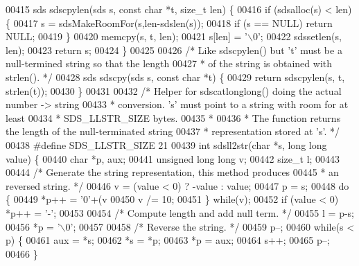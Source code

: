 \begin{DoxyCode}
{00415 sds sdscpylen(sds s, \textcolor{keyword}{const} \textcolor{keywordtype}{char} *t, size\_t len) \{
00416     \textcolor{keywordflow}{if} (sdsalloc(s) < len) \{
00417         s = sdsMakeRoomFor(s,len-sdslen(s));
00418         \textcolor{keywordflow}{if} (s == NULL) \textcolor{keywordflow}{return} NULL;
00419     \}
00420     memcpy(s, t, len);
00421     s[len] = \textcolor{stringliteral}{'\(\backslash\)0'};
00422     sdssetlen(s, len);
00423     \textcolor{keywordflow}{return} s;
00424 \}
00425 
00426 \textcolor{comment}{/* Like sdscpylen() but 't' must be a null-termined string so that the length}
00427 \textcolor{comment}{ * of the string is obtained with strlen(). */}
00428 sds sdscpy(sds s, \textcolor{keyword}{const} \textcolor{keywordtype}{char} *t) \{
00429     \textcolor{keywordflow}{return} sdscpylen(s, t, strlen(t));
00430 \}
00431 
00432 \textcolor{comment}{/* Helper for sdscatlonglong() doing the actual number -> string}
00433 \textcolor{comment}{ * conversion. 's' must point to a string with room for at least}
00434 \textcolor{comment}{ * SDS\_LLSTR\_SIZE bytes.}
00435 \textcolor{comment}{ *}
00436 \textcolor{comment}{ * The function returns the length of the null-terminated string}
00437 \textcolor{comment}{ * representation stored at 's'. */}
00438 \textcolor{preprocessor}{#}\textcolor{preprocessor}{define} \textcolor{preprocessor}{SDS\_LLSTR\_SIZE} 21
00439 \textcolor{keywordtype}{int} sdsll2str(\textcolor{keywordtype}{char} *s, \textcolor{keywordtype}{long} \textcolor{keywordtype}{long} value) \{
00440     \textcolor{keywordtype}{char} *p, aux;
00441     \textcolor{keywordtype}{unsigned} \textcolor{keywordtype}{long} \textcolor{keywordtype}{long} v;
00442     size\_t l;
00443 
00444     \textcolor{comment}{/* Generate the string representation, this method produces}
00445 \textcolor{comment}{     * an reversed string. */}
00446     v = (value < 0) ? -value : value;
00447     p = s;
00448     \textcolor{keywordflow}{do} \{
00449         *p++ = \textcolor{stringliteral}{'0'}+(v%
00450         v /= 10;
00451     \} \textcolor{keywordflow}{while}(v);
00452     \textcolor{keywordflow}{if} (value < 0) *p++ = \textcolor{stringliteral}{'-'};
00453 
00454     \textcolor{comment}{/* Compute length and add null term. */}
00455     l = p-s;
00456     *p = \textcolor{stringliteral}{'\(\backslash\)0'};
00457 
00458     \textcolor{comment}{/* Reverse the string. */}
00459     p--;
00460     \textcolor{keywordflow}{while}(s < p) \{
00461         aux = *s;
00462         *s = *p;
00463         *p = aux;
00464         s++;
00465         p--;
00466     \}
}
\end{DoxyCode}

